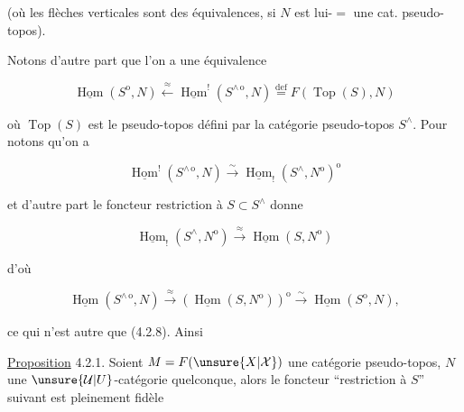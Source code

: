 (où les flèches verticales sont des équivalences, si $N$ est lui-$=$ une cat. pseudo-topos).



Notons d'autre part  que l'on a une équivalence

\[
\underline{\operatorname{Hom}}(S^{\mathrm{o}},N)\xleftarrow{\approx}
\underline{\operatorname{Hom}}^{!}(S^{\wedge\,\mathrm{o}},N)
\overset{\mathrm{def}}{=}F(\operatorname{Top}(S),N)
\tag*{(4.2.8)}
\]

où $\operatorname{Top}(S)$ est le pseudo-topos  défini par la catégorie pseudo-topos $S^{\wedge}$. Pour   notons qu'on a

\[
\underline{\operatorname{Hom}}^{!}(S^{\wedge\,\mathrm{o}},N)\xrightarrow{\sim}
\underline{\operatorname{Hom}}_{!}(S^{\wedge},N^{\mathrm{o}})^{\mathrm{o}}
\]

et d'autre part le foncteur restriction à $S\subset S^{\wedge}$ donne

\[
\underline{\operatorname{Hom}}_{!}(S^{\wedge},N^{\mathrm{o}})\xrightarrow{\approx}
\underline{\operatorname{Hom}}(S,N^{\mathrm{o}})
\]

d'où

\[
\underline{\operatorname{Hom}}(S^{\wedge\,\mathrm{o}},N)\xrightarrow{\approx}
(\underline{\operatorname{Hom}}(S,N^{\mathrm{o}}))^{\mathrm{o}}\xrightarrow{\sim}
\underline{\operatorname{Hom}}(S^{\mathrm{o}},N),
\]

ce qui n'est autre que (4.2.8). Ainsi

\uline{Proposition} 4.2.1. Soient $M=F(\unsure{X|\mathcal X})$  une catégorie pseudo-topos, $N$ une $\unsure{\mathcal U|U}$-catégorie quelconque, alors le foncteur ``restriction à $S$'' suivant est pleinement fidèle

